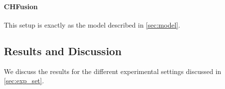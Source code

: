\documentclass[review]{elsarticle}
\newcommand\?[1]{\hl{#1}}
\begin{document}
\paragraph{CHFusion} This setup is exactly as the model described in
\cref{sec:model}.

\subsection{Results and Discussion}

We discuss the results for the different experimental settings discussed in
\cref{sec:exp_set}.

\begin{table*}[t]
    \centering
    \small
        \caption{Comparison in terms of accuracy of Hierarchical Fusion
          (HFusion) with other fusion methods for CMU-MOSI dataset; bold font
        signifies best accuracy for the corresponding feature set and
        modality or modalities, where T stands for text, V for video, and A for audio.  = Poria et al.~\citep{pordee},  = Zadeh et al.~\citep{zadten}}
    \label{table:hfusion}
\end{table*}
\end{document}
